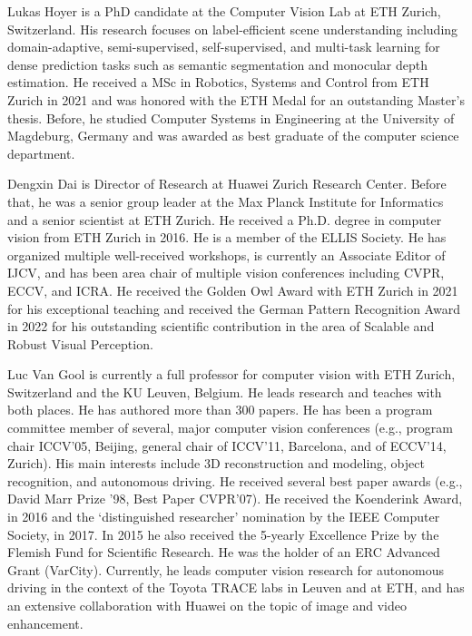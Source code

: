 \documentclass[journal,compsoc]{IEEEtran}
\begin{document}





\begin{IEEEbiography}{Lukas Hoyer} is a PhD candidate at the Computer Vision Lab at ETH Zurich, Switzerland. His research focuses on label-efficient scene understanding including domain-adaptive, semi-supervised, self-supervised, and multi-task learning for dense prediction tasks such as semantic segmentation and monocular depth estimation. 
He received a MSc in Robotics, Systems and Control from ETH Zurich in 2021 and was honored with the ETH Medal for an outstanding Master's thesis. Before, he studied Computer Systems in Engineering at the University of Magdeburg, Germany and was awarded as best graduate of the computer science department.
\end{IEEEbiography}

\begin{IEEEbiography}{Dengxin Dai} is Director of Research at Huawei Zurich Research Center. Before that, he was a senior group leader at the Max Planck Institute for Informatics and a senior scientist at ETH Zurich. He
received a Ph.D. degree in computer
vision from ETH Zurich in 2016. He is a member of the ELLIS Society. He has organized multiple well-received workshops, is currently an Associate Editor of IJCV, and has been area chair of multiple vision conferences including CVPR, ECCV, and ICRA. He received the Golden Owl Award with ETH Zurich in 2021 for his exceptional teaching and received the German Pattern Recognition Award in 2022 for his outstanding scientific contribution in the area of Scalable and Robust Visual Perception.
\end{IEEEbiography}

\begin{IEEEbiography}{Luc Van Gool}
is currently a full professor for computer vision with ETH Zurich, Switzerland and the
KU Leuven, Belgium. He leads research and
teaches with both places. He has authored more
than 300 papers. He has been a program committee member of several, major computer vision conferences (e.g., program chair ICCV’05, Beijing,
general chair of ICCV’11, Barcelona, and of
ECCV’14, Zurich). His main interests include 3D
reconstruction and modeling, object recognition,
and autonomous driving. He received several best
paper awards (e.g., David Marr Prize ’98, Best Paper CVPR’07). He
received the Koenderink Award, in 2016 and the ‘distinguished researcher’
nomination by the IEEE Computer Society, in 2017. In 2015 he also
received the 5-yearly Excellence Prize by the Flemish Fund for Scientific
Research. He was the holder of an ERC Advanced Grant (VarCity). Currently, he leads computer vision research for autonomous driving in the context of the Toyota TRACE labs in Leuven and at ETH, and has an extensive
collaboration with Huawei on the topic of image and video enhancement.
\end{IEEEbiography}

 



 



\vfill
\end{document}
